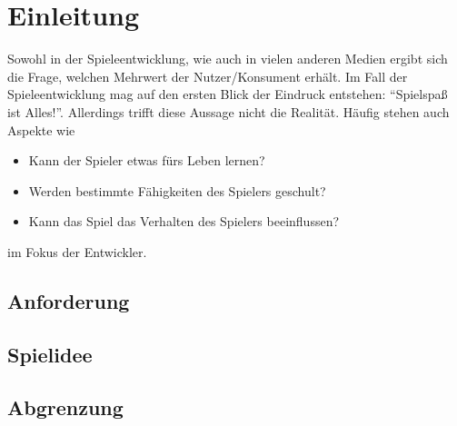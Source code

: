 \section{Einleitung}
Sowohl in der Spieleentwicklung, wie auch in vielen anderen Medien ergibt sich die Frage, welchen Mehrwert der Nutzer/Konsument erhält. Im Fall der Spieleentwicklung mag auf den ersten Blick der Eindruck entstehen: \enquote{Spielspaß ist Alles!}.
Allerdings trifft diese Aussage nicht die Realität. Häufig stehen auch Aspekte wie 
\begin{itemize}
	\item Kann der Spieler etwas fürs Leben lernen?
	\item Werden bestimmte Fähigkeiten des Spielers geschult?
	\item Kann das Spiel das Verhalten des Spielers beeinflussen?
\end{itemize}
im Fokus der Entwickler.
\subsection{Anforderung}
\subsection{Spielidee}
\subsection{Abgrenzung}
